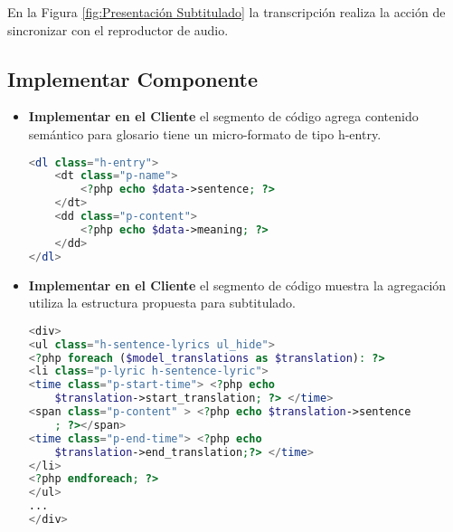 \begin{itemize}
\begin{enumerate}
\begin{enumerate}
\begin{enumerate}
				\end{enumerate}					

	\end{enumerate}

\end{enumerate}

En la Figura \ref{fig:Presentación Subtitulado} la transcripción realiza la
acción de sincronizar con el reproductor de audio.

\begin{minipage}{1.0\textwidth}
	\centering
	\label{fig:Presentación Subtitulado}
\end{minipage}

\end{itemize}


\subsection{Implementar Componente}

\begin{itemize}

\item \textbf{Implementar en el Cliente} el segmento de código agrega contenido
semántico para glosario tiene un micro-formato de tipo h-entry.

\begin{lstlisting}[language = PHP, caption={Representación de glosario.}]
<dl class="h-entry">
    <dt class="p-name">
        <?php echo $data->sentence; ?> 
    </dt> 
    <dd class="p-content">
        <?php echo $data->meaning; ?> 
    </dd>
</dl>
\end{lstlisting}

\item \textbf{Implementar en el Cliente} el segmento de código muestra la
agregación utiliza la estructura propuesta para subtitulado.

\begin{lstlisting}[language = PHP, caption={Estructura de sentencia.}]
<div>
<ul class="h-sentence-lyrics ul_hide">
<?php foreach ($model_translations as $translation): ?>  
<li class="p-lyric h-sentence-lyric"> 
<time class="p-start-time"> <?php echo 
    $translation->start_translation; ?> </time>    
<span class="p-content" > <?php echo $translation->sentence
    ; ?></span>
<time class="p-end-time"> <?php echo 
    $translation->end_translation;?> </time>
</li>
<?php endforeach; ?>
</ul>
...
</div>
\end{lstlisting}

\end{itemize}

